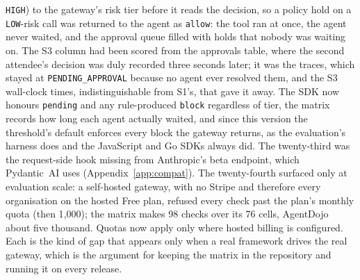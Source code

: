\texttt{HIGH}) to the gateway's risk tier before it reads the decision,
so a policy hold on a \texttt{LOW}-risk call was returned to the agent as
\texttt{allow}: the tool ran at once, the agent never waited, and the
approval queue filled with holds that nobody was waiting on. The S3
column had been scored from the approvals table, where the second
attendee's decision was duly recorded three seconds later; it was the
traces, which stayed at \texttt{PENDING\_APPROVAL} because no agent ever
resolved them, and the S3 wall-clock times, indistinguishable from S1's,
that gave it away. The SDK now honours \texttt{pending} and any rule-produced \texttt{block} regardless of tier, the matrix records how long each agent actually waited, and since this version the threshold's default enforces every block the gateway returns, as the evaluation's harness does and the JavaScript and Go SDKs always did. The twenty-third was the request-side hook missing from Anthropic's beta endpoint, which Pydantic~AI uses (Appendix~\ref{app:compat}). The twenty-fourth surfaced only at evaluation scale: a self-hosted gateway, with no Stripe and therefore every organisation on the hosted Free plan, refused every check past the plan's monthly quota (then 1{,}000); the matrix makes 98 checks over its 76 cells, AgentDojo about five thousand. Quotas now apply only where hosted billing is
configured. Each is the
kind of gap that appears only when a real framework drives the real
gateway, which is the argument for keeping the matrix in the repository
and running it on every release.
